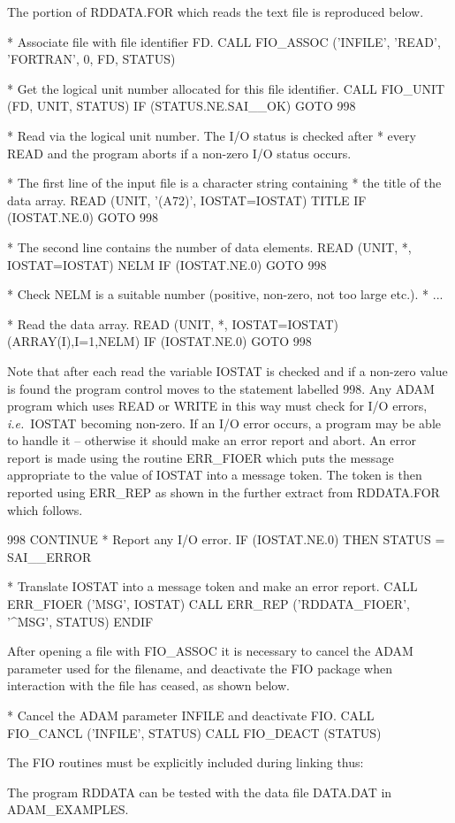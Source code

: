 \documentclass[twoside,11pt,nolof]{starlink}
\begin{document}
The portion of RDDATA.FOR which reads the text file is reproduced below.
\begin{terminalv}
*  Associate file with file identifier FD.
      CALL FIO_ASSOC ('INFILE', 'READ', 'FORTRAN', 0, FD, STATUS)

*  Get the logical unit number allocated for this file identifier.
      CALL FIO_UNIT (FD, UNIT, STATUS)
      IF (STATUS.NE.SAI__OK) GOTO 998

*  Read via the logical unit number. The I/O status is checked after
*  every READ and the program aborts if a non-zero I/O status occurs.

*  The first line of the input file is a character string containing
*  the title of the data array.
      READ (UNIT, '(A72)', IOSTAT=IOSTAT) TITLE
      IF (IOSTAT.NE.0) GOTO 998

*   The second line contains the number of data elements.
      READ (UNIT, *, IOSTAT=IOSTAT) NELM
      IF (IOSTAT.NE.0) GOTO 998

*   Check NELM is a suitable number (positive, non-zero, not too large etc.).
*   ...

*   Read the data array.
      READ (UNIT, *, IOSTAT=IOSTAT) (ARRAY(I),I=1,NELM)
      IF (IOSTAT.NE.0) GOTO 998
\end{terminalv}
Note that after each read the variable IOSTAT is checked and
if a non-zero value is found the program control moves to the statement
labelled 998.
Any ADAM  program which uses READ or WRITE in this way must check
for I/O errors,  \textit{i.e.}\ IOSTAT becoming non-zero.
If an I/O error occurs, a program  may be able to handle it --
otherwise it should make an error report and abort.
An error report is made using the routine ERR\_FIOER which puts
the message appropriate
to the value of IOSTAT into a message token. The token is then
reported using ERR\_REP as shown in the  further extract from RDDATA.FOR
which follows.
\begin{terminalv}
998   CONTINUE
*   Report any I/O error.
      IF (IOSTAT.NE.0) THEN
         STATUS = SAI__ERROR

*      Translate IOSTAT into a message token and make an error report.
         CALL ERR_FIOER ('MSG', IOSTAT)
         CALL ERR_REP ('RDDATA_FIOER', '^MSG', STATUS)
      ENDIF
\end{terminalv}
After opening a file with FIO\_ASSOC it is necessary to cancel the ADAM
parameter used for the filename, and deactivate the FIO package when
interaction with the file
has ceased, as shown below.
\begin{terminalv}
*   Cancel the ADAM parameter INFILE and deactivate FIO.
      CALL FIO_CANCL ('INFILE', STATUS)
      CALL FIO_DEACT (STATUS)
\end{terminalv}
The FIO routines must be explicitly included during linking thus:
The program RDDATA can be tested with the data file DATA.DAT in
ADAM\_EXAMPLES.
\end{document}
